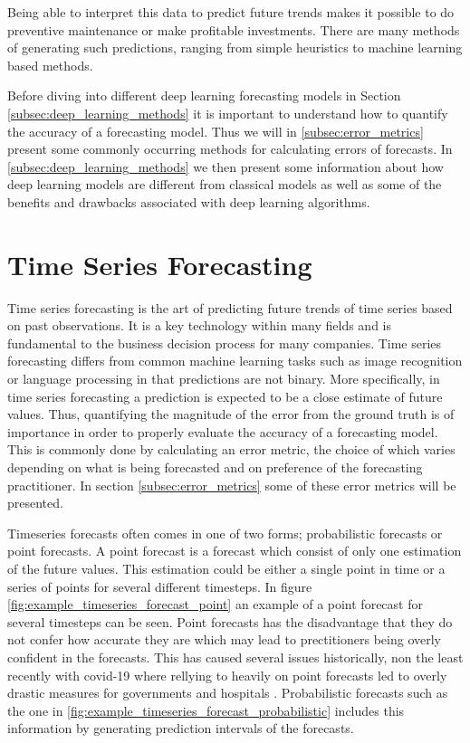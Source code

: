  Being able to interpret this data to predict future trends makes it possible to do preventive maintenance or make profitable investments. There are many methods of generating such predictions, ranging from simple heuristics to machine learning based methods. 


Before diving into different deep learning forecasting models in Section \ref{subsec:deep_learning_methods} it is important to understand how to quantify the accuracy of a forecasting model. Thus we will in \ref{subsec:error_metrics} present some commonly occurring methods for calculating errors of forecasts. In \ref{subsec:deep_learning_methods} we then present some information about how deep learning models are different from classical models as well as some of the benefits and drawbacks associated with deep learning algorithms.


\section{Time Series Forecasting}
\label{sec_time_series_forecasting}
Time series forecasting is the art of predicting future trends of time series based on past observations. It is a key technology within many fields and is fundamental to the business decision process for many companies. Time series forecasting differs from common machine learning tasks such as image recognition or language processing in that predictions are not binary. More specifically, in time series forecasting a prediction is expected to be a close estimate of future values. Thus, quantifying the magnitude of the error from the ground truth is of importance in order to properly evaluate the accuracy of a forecasting model. This is commonly done by calculating an error metric, the choice of which varies depending on what is being forecasted and on preference of the forecasting practitioner. In section \ref{subsec:error_metrics} some of these error metrics will be presented.

Timeseries forecasts often comes in one of two forms; probabilistic forecasts or point forecasts. A point forecast is a forecast which consist of only one estimation of the future values. This estimation could be either a single point in time or a series of points for several different timesteps. In figure \ref{fig:example_timeseries_forecast_point} an example of a point forecast for several timesteps can be seen. Point forecasts has the disadvantage that they do not confer how accurate they are which may lead to prectitioners being overly confident in the forecasts. This has caused several issues historically, non the least recently with covid-19 where rellying to heavily on point forecasts led to overly drastic measures for governments and hospitals \cite{IOANNIDIS2020}. Probabilistic forecasts such as the one in \ref{fig:example_timeseries_forecast_probabilistic} includes this information by generating prediction intervals of the forecasts.

